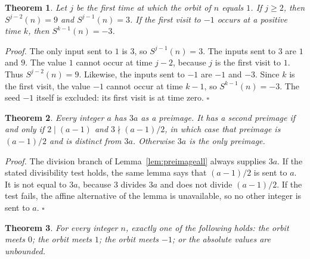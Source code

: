 \documentclass[11pt,letterpaper]{article}
\newtheorem{theorem}{Theorem}
\newenvironment{proof}{\noindent\textit{Proof.}}{\hfill\(\square\)}
\begin{document}
\begin{theorem}
\label{thm:gates}
Let \(j\) be the first time at which the orbit of \(n\) equals \(1\). If \(j\ge 2\), then \(S^{j-2}(n)=9\) and \(S^{j-1}(n)=3\). If the first visit to \(-1\) occurs at a positive time \(k\), then \(S^{k-1}(n)=-3\).
\end{theorem}

\begin{proof}
The only input sent to \(1\) is \(3\), so \(S^{j-1}(n)=3\). The inputs sent to \(3\) are \(1\) and \(9\). The value \(1\) cannot occur at time \(j-2\), because \(j\) is the first visit to \(1\). Thus \(S^{j-2}(n)=9\). Likewise, the inputs sent to \(-1\) are \(-1\) and \(-3\). Since \(k\) is the first visit, the value \(-1\) cannot occur at time \(k-1\), so \(S^{k-1}(n)=-3\). The seed \(-1\) itself is excluded: its first visit is at time zero.
\end{proof}

\begin{theorem}
\label{thm:branch}
Every integer \(a\) has \(3a\) as a preimage. It has a second preimage if and only if \(2\mid(a-1)\) and \(3\nmid(a-1)/2\), in which case that preimage is \((a-1)/2\) and is distinct from \(3a\). Otherwise \(3a\) is the only preimage.
\end{theorem}

\begin{proof}
The division branch of Lemma~\ref{lem:preimageall} always supplies \(3a\). If the stated divisibility test holds, the same lemma says that \((a-1)/2\) is sent to \(a\). It is not equal to \(3a\), because \(3\) divides \(3a\) and does not divide \((a-1)/2\). If the test fails, the affine alternative of the lemma is unavailable, so no other integer is sent to \(a\).
\end{proof}

\begin{theorem}
\label{thm:partition}
For every integer \(n\), exactly one of the following holds: the orbit meets \(0\); the orbit meets \(1\); the orbit meets \(-1\); or the absolute values are unbounded.
\end{theorem}
\end{document}
